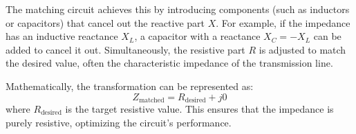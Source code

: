The matching circuit achieves this by introducing components (such as inductors or capacitors) that cancel out the reactive part \( X \). For example, if the impedance has an inductive reactance \( X_L \), a capacitor with a reactance \( X_C = -X_L \) can be added to cancel it out. Simultaneously, the resistive part \( R \) is adjusted to match the desired value, often the characteristic impedance of the transmission line.

Mathematically, the transformation can be represented as:
\[
Z_{\text{matched}} = R_{\text{desired}} + j0
\]
where \( R_{\text{desired}} \) is the target resistive value. This ensures that the impedance is purely resistive, optimizing the circuit's performance.

